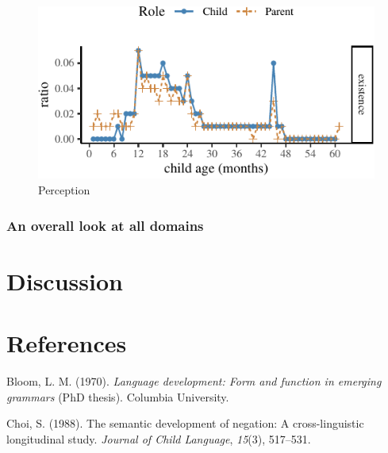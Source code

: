 \documentclass[10pt, letterpaper]{article}
\newenvironment{CodeChunk}{}{}
\begin{document}
\begin{CodeChunk}
\begin{figure}[H]

{\centering \includegraphics{figs/perception-1} 

}

\caption[Perception]{Perception}\label{fig:perception}
\end{figure}
\end{CodeChunk}

\hypertarget{an-overall-look-at-all-domains}{%
\subsubsection{An overall look at all
domains}\label{an-overall-look-at-all-domains}}

\hypertarget{discussion}{%
\section{Discussion}\label{discussion}}

\hypertarget{references}{%
\section{References}\label{references}}

\setlength{\parindent}{-0.1in} 
\setlength{\leftskip}{0.125in}

\noindent

\hypertarget{refs}{}
\leavevmode\hypertarget{ref-bloom1970language}{}%
Bloom, L. M. (1970). \emph{Language development: Form and function in
emerging grammars} (PhD thesis). Columbia University.

\leavevmode\hypertarget{ref-choi1988semantic}{}%
Choi, S. (1988). The semantic development of negation: A
cross-linguistic longitudinal study. \emph{Journal of Child Language},
\emph{15}(3), 517--531.
\end{document}
